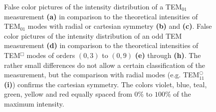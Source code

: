 \documentclass[a4paper]{scrartcl}
\numberwithin{equation}{section}
\numberwithin{figure}{section}
\numberwithin{table}{section}
\begin{document}
\begin{figure}[p]
\begin{tabular}{ccc}
\end{tabular}
\caption{\small False color pictures of the intensity distribution of a TEM$_{01}$ measurement \textbf{(a)} in comparison to the theoretical intensities of TEM$_{01}$ modes with radial or cartesian symmetry \textbf{(b)} and \textbf{(c)}. False color pictures of the intensity distribution of an odd TEM measurement \textbf{(d)} in comparison to the theoretical intensities of TEM$^\Box$ modes of orders $(0,3)$  to $(0,9)$ \textbf{(e)} through \textbf{(h)}. The rather small differences do not allow a certain classification of the measurement, but the comparison with radial modes (e.g. TEM$^\bigcirc_{11}$ \textbf{(i)}) confirms the cartesian symmetry. The colors violet, blue, teal, green, yellow and red equally spaced from $0\%$ to $100\%$ of the maximum intensity.  }
\label{fig:tem0103}
\end{figure}
\end{document}
